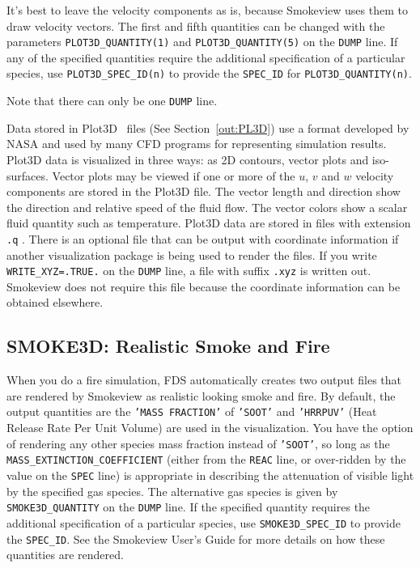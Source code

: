 \documentclass[11pt]{book}
\newcommand{\ct}{\tt\small}
\begin{document}
\noindent
It's best to leave the velocity components as is, because Smokeview
uses them to draw velocity vectors. The first and fifth quantities can
be changed with the parameters {\ct PLOT3D\_QUANTITY(1)} and {\ct PLOT3D\_QUANTITY(5)}
on the {\ct DUMP} line. If any of the specified quantities require the additional specification of a particular species,
use {\ct PLOT3D\_SPEC\_ID(n)} to provide the {\ct SPEC\_ID} for {\ct PLOT3D\_QUANTITY(n)}.

\begin{warning}
Note that there can only be one {\ct DUMP} line.
\end{warning}

Data stored in Plot3D~\cite{PLOT3D} files (See Section~\ref{out:PL3D}) use a format developed by
NASA and used by many CFD programs for representing simulation results.
Plot3D data is visualized in three ways: as 2D contours, vector plots and iso-surfaces.
Vector plots may be viewed if one or more of the $u$, $v$ and $w$
velocity components are stored in the Plot3D file. The vector
length and direction show the direction and relative speed of the
fluid flow. The vector colors show a scalar fluid quantity such as
temperature.
Plot3D data are stored in files with extension {\ct .q} . There is
an optional file that can be output with coordinate information
if another visualization package is being used to render the
files. If you write {\ct WRITE\_XYZ=.TRUE.} on the {\ct DUMP}
line, a file with suffix {\ct .xyz} is written out. Smokeview
does not require this file because the coordinate information can be
obtained elsewhere.



\subsection{SMOKE3D: Realistic Smoke and Fire}

\label{info:SMOKE3D}

When you do a fire simulation, FDS automatically creates two output files that are rendered by
Smokeview as realistic looking smoke and fire. By default, the output quantities are the {\ct 'MASS FRACTION'} of {\ct 'SOOT'} and {\ct 'HRRPUV'} (Heat Release Rate Per Unit Volume)
are used in the visualization. You have the option of rendering any other species mass fraction instead of {\ct 'SOOT'}, so long as the
{\ct MASS\_EXTINCTION\_COEFFICIENT} (either from the {\ct REAC} line, or over-ridden by the value on the {\ct SPEC} line) is appropriate in
describing the attenuation of visible light by the specified gas species.
The alternative gas species is given by {\ct SMOKE3D\_QUANTITY} on the {\ct DUMP} line.
If the specified quantity requires the additional specification of a particular species,
use {\ct SMOKE3D\_SPEC\_ID} to provide the {\ct SPEC\_ID}.
See the Smokeview User's Guide for more details on how these quantities are rendered.
\end{document}
